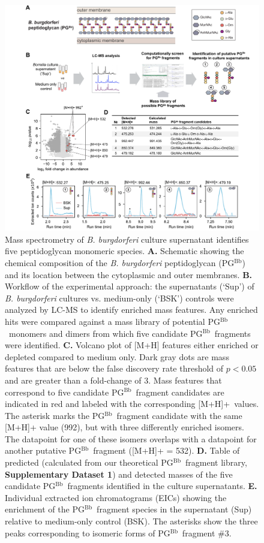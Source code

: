 \documentclass[twoside, watermark]{zHenriquesLab-StyleBioRxiv}
\newcommand{\adductone}{[M+H]+}
\newcommand{\pgbb}{PG$^\text{Bb}$}
\begin{document}
\begin{figure}
    \centering
    \includegraphics[width=\textwidth]{Figures/Figure_1_Muropeptide_ID.pdf}
\caption{Mass spectrometry of \textit{B. burgdorferi} culture supernatant identifies five peptidoglycan monomeric species. \textbf{A.} Schematic showing the chemical composition of the \textit{B. burgdorferi} peptidoglycan (\pgbb ) and its location between the cytoplasmic and outer membranes. \textbf{B.} Workflow of the experimental approach: the supernatants (‘Sup’) of \textit{B. burgdorferi} cultures vs. medium-only (‘BSK’) controls were analyzed by LC-MS to identify enriched mass features. Any enriched hits were compared against a mass library of potential \pgbb~monomers and dimers from which five candidate \pgbb~fragments were identified. \textbf{C.} Volcano plot of [M+H] features either enriched or depleted compared to medium only. Dark gray dots are mass features that are below the false discovery rate threshold of $p < 0.05$ and are greater than a fold-change of 3. Mass features that correspond to five candidate \pgbb~fragment candidates are indicated in red and labeled with the corresponding \adductone~values. The asterisk marks the \pgbb~fragment candidate with the same [M+H]+ value (992), but with three differently enriched isomers. The datapoint for one of these isomers overlaps with a datapoint for another putative \pgbb~fragment ([M+H]+ = 532).  \textbf{D.} Table of predicted (calculated from our theoretical \pgbb~fragment library, \textbf{Supplementary Dataset 1}) and detected masses of the five candidate \pgbb~fragments identified in the culture supernatants. \textbf{E.} Individual extracted ion chromatograms (EICs) showing the enrichment of the \pgbb~fragment species in the supernatant (Sup) relative to medium-only control (BSK).  The asterisks show the three peaks corresponding to isomeric forms of \pgbb~fragment \#3.}
    \label{fig: fig1}
\end{figure}
\end{document}

